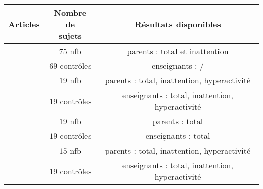 \begin{tabular}{ccc}
\toprule
Articles & \shortstack{ Nombre de \\ sujets} & Résultats disponibles \\
\midrule
\multirow{2}{*}{ \citet{Aggensteiner2019} } & $75$ \gls{nfb} & parents : total et inattention \\
                                          & $69$ contrôles & enseignants : / \\																		
\multirow{2}{*}{ \citet{Minder2018} } &  $19$ \gls{nfb} & parents : total, inattention, hyperactivité \\
                                      & $19$ contrôles & enseignants : total, inattention, hyperactivité \\ 
\multirow{2}{*}{ \citet{Moreno2019} } & $19$ \gls{nfb} & parents : total \\
                                      & $19$ contrôles & enseignants : total \\
\multirow{2}{*}{ \citet{Shereena2019} } & $15$ \gls{nfb} & parents : total, inattention, hyperactivité \\
                                      & $19$ contrôles & enseignants : total, inattention, hyperactivité \\
\bottomrule
\end{tabular}
